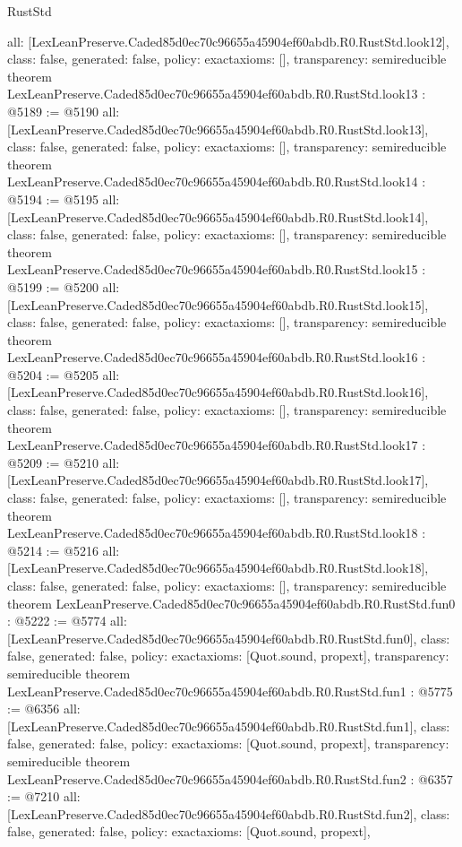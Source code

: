 \begin{lexlean}{RustStd}
\begin{coremodule}
{  all: [LexLeanPreserve.Caded85d0ec70c96655a45904ef60abdb.R0.RustStd.look12],
  class: false,
  generated: false,
  policy: exact{axioms: []},
  transparency: semireducible
}
theorem LexLeanPreserve.Caded85d0ec70c96655a45904ef60abdb.R0.RustStd.look13 : @5189 := @5190 {
  all: [LexLeanPreserve.Caded85d0ec70c96655a45904ef60abdb.R0.RustStd.look13],
  class: false,
  generated: false,
  policy: exact{axioms: []},
  transparency: semireducible
}
theorem LexLeanPreserve.Caded85d0ec70c96655a45904ef60abdb.R0.RustStd.look14 : @5194 := @5195 {
  all: [LexLeanPreserve.Caded85d0ec70c96655a45904ef60abdb.R0.RustStd.look14],
  class: false,
  generated: false,
  policy: exact{axioms: []},
  transparency: semireducible
}
theorem LexLeanPreserve.Caded85d0ec70c96655a45904ef60abdb.R0.RustStd.look15 : @5199 := @5200 {
  all: [LexLeanPreserve.Caded85d0ec70c96655a45904ef60abdb.R0.RustStd.look15],
  class: false,
  generated: false,
  policy: exact{axioms: []},
  transparency: semireducible
}
theorem LexLeanPreserve.Caded85d0ec70c96655a45904ef60abdb.R0.RustStd.look16 : @5204 := @5205 {
  all: [LexLeanPreserve.Caded85d0ec70c96655a45904ef60abdb.R0.RustStd.look16],
  class: false,
  generated: false,
  policy: exact{axioms: []},
  transparency: semireducible
}
theorem LexLeanPreserve.Caded85d0ec70c96655a45904ef60abdb.R0.RustStd.look17 : @5209 := @5210 {
  all: [LexLeanPreserve.Caded85d0ec70c96655a45904ef60abdb.R0.RustStd.look17],
  class: false,
  generated: false,
  policy: exact{axioms: []},
  transparency: semireducible
}
theorem LexLeanPreserve.Caded85d0ec70c96655a45904ef60abdb.R0.RustStd.look18 : @5214 := @5216 {
  all: [LexLeanPreserve.Caded85d0ec70c96655a45904ef60abdb.R0.RustStd.look18],
  class: false,
  generated: false,
  policy: exact{axioms: []},
  transparency: semireducible
}
theorem LexLeanPreserve.Caded85d0ec70c96655a45904ef60abdb.R0.RustStd.fun0 : @5222 := @5774 {
  all: [LexLeanPreserve.Caded85d0ec70c96655a45904ef60abdb.R0.RustStd.fun0],
  class: false,
  generated: false,
  policy: exact{axioms: [Quot.sound, propext]},
  transparency: semireducible
}
theorem LexLeanPreserve.Caded85d0ec70c96655a45904ef60abdb.R0.RustStd.fun1 : @5775 := @6356 {
  all: [LexLeanPreserve.Caded85d0ec70c96655a45904ef60abdb.R0.RustStd.fun1],
  class: false,
  generated: false,
  policy: exact{axioms: [Quot.sound, propext]},
  transparency: semireducible
}
theorem LexLeanPreserve.Caded85d0ec70c96655a45904ef60abdb.R0.RustStd.fun2 : @6357 := @7210 {
  all: [LexLeanPreserve.Caded85d0ec70c96655a45904ef60abdb.R0.RustStd.fun2],
  class: false,
  generated: false,
  policy: exact{axioms: [Quot.sound, propext]},
}
\end{coremodule}
\end{lexlean}
